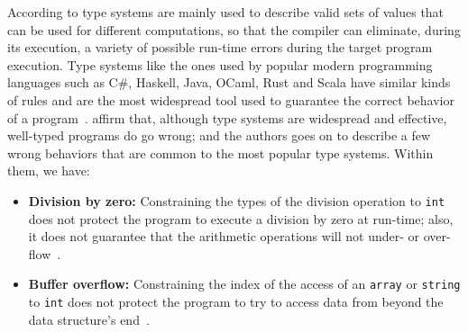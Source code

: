 \documentclass[
  oneside,
  english,
  coorientadorbanca,
  noabntexcite
]{ufsc-thesis-rn46-2019}
\newcommand{\code}[1]{\texttt{#1}}
\begin{document}
According to \textcite{jhala2020tutorial} type systems are mainly used to describe valid sets of values that can be used for different computations, so that the compiler can eliminate, during its execution, a variety of possible run-time errors during the target program execution.
Type systems like the ones used by popular modern programming languages such as C\#, Haskell, Java, OCaml, Rust and Scala have similar kinds of rules and are the most widespread tool used to guarantee the correct behavior of a program~\cite{jhala2020tutorial}.
\textcite{jhala2020tutorial} affirm that, although type systems are widespread and effective, well-typed programs do go wrong; and the authors goes on to describe a few wrong behaviors that are common to the most popular type systems. Within them, we have:
\begin{itemize}
  \item \textbf{Division by zero:} Constraining the types of the division operation to \code{int} does not protect the program to execute a division by zero at run-time; also, it does not guarantee that the arithmetic operations will not under- or over-flow~\cite{jhala2020tutorial}.
  \item \textbf{Buffer overflow:} Constraining the index of the access of an \code{array} or \code{string} to \code{int} does not protect the program to try to access data from beyond the data structure's end~\cite{jhala2020tutorial}.
\end{itemize}
\end{document}
